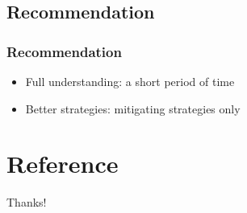 \documentclass{beamer}
\begin{document}
\subsection{Recommendation}

\begin{frame}
    \frametitle{Recommendation}
    \LARGE
    \begin{itemize}[<+->]
        \item Full understanding: a short period of time
        \item Better strategies: mitigating strategies only
    \end{itemize}
\end{frame}

\section{Reference}

\begin{frame}[allowframebreaks]
    
    
\end{frame}

\begin{frame}
    \begin{center}
        {\Huge\calligra Thanks!}\cite{origin}
    \end{center}
\end{frame}
\end{document}
